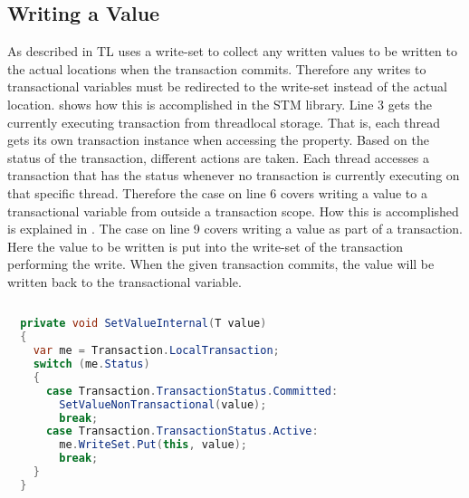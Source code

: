 \subsection{Writing a Value}
\label{sec:stm_imple_internal_detials_write}
As described in  TL uses a write-set to collect any written values to be written to the actual locations when the transaction commits. Therefore any writes to transactional variables must be redirected to the write-set instead of the actual location.  shows how this is accomplished in the \ac{STM} library. Line 3 gets the currently executing transaction from threadlocal storage. That is, each thread gets its own transaction instance when accessing the  property. Based on the status of the transaction, different actions are taken. Each thread accesses a transaction that has the status  whenever no transaction is currently executing on that specific thread. Therefore the case on line 6 covers writing a value to a transactional variable from outside a transaction scope. How this is accomplished is explained in . The case on line 9 covers writing a value as part of a transaction. Here the value to be written is put into the write-set of the transaction performing the write. When the given transaction commits, the value will be written back to the transactional variable.

\begin{lstlisting}[label=lst:library_write_value,
  caption={Writing to a Transactional Variable},
  language=Java,  
  showspaces=false,
  showtabs=false,
  breaklines=true,
  showstringspaces=false,
  breakatwhitespace=true,
  commentstyle=\color{greencomments},
  keywordstyle=\color{bluekeywords},
  stringstyle=\color{redstrings},
  morekeywords={atomic, retry, orElse, var, get, set}]  % Start your code-block
  
  private void SetValueInternal(T value)
  {
    var me = Transaction.LocalTransaction;
    switch (me.Status)
    {
      case Transaction.TransactionStatus.Committed:
        SetValueNonTransactional(value);
        break;
      case Transaction.TransactionStatus.Active:
        me.WriteSet.Put(this, value);
        break;
    }
  }
\end{lstlisting}

